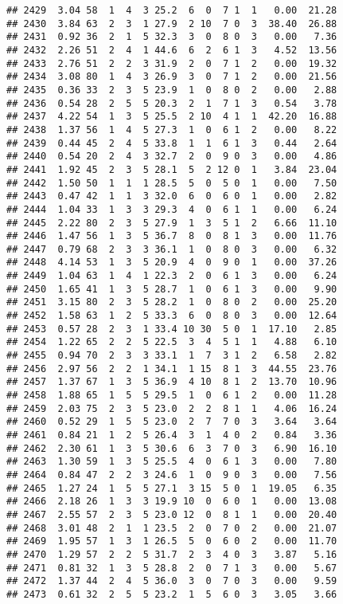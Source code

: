 \documentclass[
]{article}
\begin{document}
\begin{verbatim}
## 2429  3.04 58  1  4  3 25.2  6  0  7 1  1   0.00  21.28
## 2430  3.84 63  2  3  1 27.9  2 10  7 0  3  38.40  26.88
## 2431  0.92 36  2  1  5 32.3  3  0  8 0  3   0.00   7.36
## 2432  2.26 51  2  4  1 44.6  6  2  6 1  3   4.52  13.56
## 2433  2.76 51  2  2  3 31.9  2  0  7 1  2   0.00  19.32
## 2434  3.08 80  1  4  3 26.9  3  0  7 1  2   0.00  21.56
## 2435  0.36 33  2  3  5 23.9  1  0  8 0  2   0.00   2.88
## 2436  0.54 28  2  5  5 20.3  2  1  7 1  3   0.54   3.78
## 2437  4.22 54  1  3  5 25.5  2 10  4 1  1  42.20  16.88
## 2438  1.37 56  1  4  5 27.3  1  0  6 1  2   0.00   8.22
## 2439  0.44 45  2  4  5 33.8  1  1  6 1  3   0.44   2.64
## 2440  0.54 20  2  4  3 32.7  2  0  9 0  3   0.00   4.86
## 2441  1.92 45  2  3  5 28.1  5  2 12 0  1   3.84  23.04
## 2442  1.50 50  1  1  1 28.5  5  0  5 0  1   0.00   7.50
## 2443  0.47 42  1  1  3 32.0  6  0  6 0  1   0.00   2.82
## 2444  1.04 33  1  3  3 29.3  4  0  6 1  1   0.00   6.24
## 2445  2.22 80  2  3  5 27.9  1  3  5 1  2   6.66  11.10
## 2446  1.47 56  1  3  5 36.7  8  0  8 1  3   0.00  11.76
## 2447  0.79 68  2  3  3 36.1  1  0  8 0  3   0.00   6.32
## 2448  4.14 53  1  3  5 20.9  4  0  9 0  1   0.00  37.26
## 2449  1.04 63  1  4  1 22.3  2  0  6 1  3   0.00   6.24
## 2450  1.65 41  1  3  5 28.7  1  0  6 1  3   0.00   9.90
## 2451  3.15 80  2  3  5 28.2  1  0  8 0  2   0.00  25.20
## 2452  1.58 63  1  2  5 33.3  6  0  8 0  3   0.00  12.64
## 2453  0.57 28  2  3  1 33.4 10 30  5 0  1  17.10   2.85
## 2454  1.22 65  2  2  5 22.5  3  4  5 1  1   4.88   6.10
## 2455  0.94 70  2  3  3 33.1  1  7  3 1  2   6.58   2.82
## 2456  2.97 56  2  2  1 34.1  1 15  8 1  3  44.55  23.76
## 2457  1.37 67  1  3  5 36.9  4 10  8 1  2  13.70  10.96
## 2458  1.88 65  1  5  5 29.5  1  0  6 1  2   0.00  11.28
## 2459  2.03 75  2  3  5 23.0  2  2  8 1  1   4.06  16.24
## 2460  0.52 29  1  5  5 23.0  2  7  7 0  3   3.64   3.64
## 2461  0.84 21  1  2  5 26.4  3  1  4 0  2   0.84   3.36
## 2462  2.30 61  1  3  5 30.6  6  3  7 0  3   6.90  16.10
## 2463  1.30 59  1  3  5 25.5  4  0  6 1  3   0.00   7.80
## 2464  0.84 47  2  2  3 24.6  1  0  9 0  3   0.00   7.56
## 2465  1.27 24  1  5  5 27.1  3 15  5 0  1  19.05   6.35
## 2466  2.18 26  1  3  3 19.9 10  0  6 0  1   0.00  13.08
## 2467  2.55 57  2  3  5 23.0 12  0  8 1  1   0.00  20.40
## 2468  3.01 48  2  1  1 23.5  2  0  7 0  2   0.00  21.07
## 2469  1.95 57  1  3  1 26.5  5  0  6 0  2   0.00  11.70
## 2470  1.29 57  2  2  5 31.7  2  3  4 0  3   3.87   5.16
## 2471  0.81 32  1  3  5 28.8  2  0  7 1  3   0.00   5.67
## 2472  1.37 44  2  4  5 36.0  3  0  7 0  3   0.00   9.59
## 2473  0.61 32  2  5  5 23.2  1  5  6 0  3   3.05   3.66

\end{verbatim}
\end{document}
